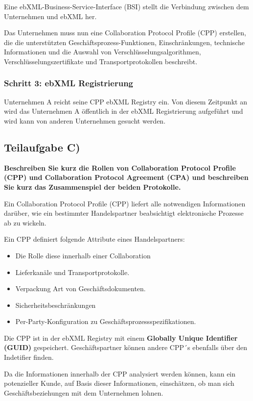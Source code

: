 Eine ebXML-Business-Service-Interface (BSI) stellt die Verbindung zwischen dem
Unternehmen und ebXML her.

Das Unternehmen muss nun eine Collaboration Protocol Profile (CPP) erstellen,
die die unterstützten Geschäftsprozess-Funktionen, Einschränkungen, technische
Informationen und die Auswahl von Verschlüsselungsalgorithmen,
Verschlüsselungszertifikate und Transportprotokollen beschreibt. 

\subsubsection{Schritt 3: ebXML Registrierung}
Unternehmen A reicht seine CPP ebXML Registry ein. Von diesem Zeitpunkt an wird
das Unternehmen A öffentlich in der ebXML Registrierung aufgeführt und wird
kann von anderen Unternehmen gesucht werden.

\subsection{Teilaufgabe C)}
\textbf{Beschreiben Sie kurz die Rollen von Collaboration Protocol Profile (CPP) und
Collaboration Protocol Agreement (CPA) und beschreiben Sie kurz das
Zusammenspiel der beiden Protokolle.}

Ein Collaboration Protocol Profile (CPP) liefert alle notwendigen Informationen
darüber, wie ein bestimmter Handelspartner beabsichtigt elektronische Prozesse
ab zu wickeln.

Ein CPP definiert folgende Attribute eines Handelspartners:
\begin{itemize}
  \item Die Rolle diese innerhalb einer Collaboration
  \item Lieferkanäle und Transportprotokolle.
  \item Verpackung Art von Geschäftsdokumenten. 
  \item Sicherheitsbeschränkungen
  \item Per-Party-Konfiguration zu Geschäftsprozessspezifikationen. 
\end{itemize}

Die CPP ist in der ebXML Registry mit einem \textbf{Globally Unique Identifier
(GUID)} gespeichert. Geschäftspartner können andere CPP´s ebenfalls über den
Indetifier finden.

Da die Informationen innerhalb der CPP analysiert werden können, kann ein
potenzieller Kunde, auf Basis dieser Informationen, einschätzen, ob man sich
Geschäftsbeziehungen mit dem Unternehmen lohnen.
\clearpage 